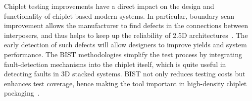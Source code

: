 \documentclass[acmtog, 12pt]{acmart}
\begin{document}






Chiplet testing improvements have a direct impact on the design and functionality of chiplet-based modern systems. In particular, boundary scan improvement allows the manufacturer to find defects in the connections between interposers, and thus helps to keep up the reliability of 2.5D architectures~\cite{10365967}. The early detection of such defects will allow designers to improve yields and system performance.
The BIST methodologies simplify the test process by integrating fault-detection mechanisms into the chiplet itself, which is quite useful in detecting faults in 3D stacked systems. BIST not only reduces testing costs but enhances test coverage, hence making the tool important in high-density chiplet packaging~\cite{10766679}.
\end{document}
